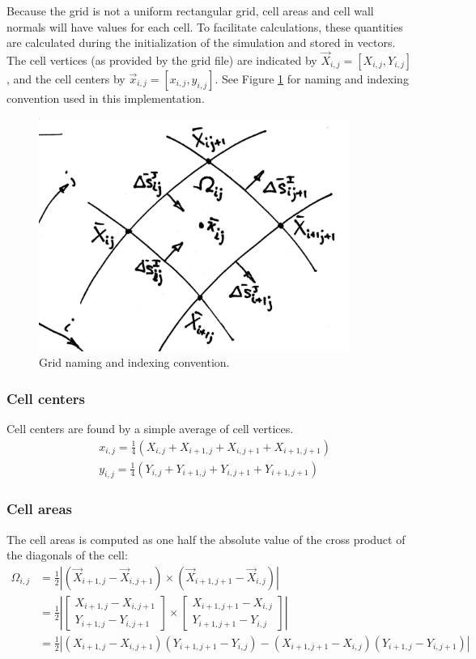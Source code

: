 \documentclass[11pt]{article}
\begin{document}
	Because the grid is not a uniform rectangular grid, cell areas and cell wall normals will have values for each cell. To facilitate calculations, these quantities are calculated during the initialization of the simulation and stored in vectors.  The cell vertices (as provided by the grid file) are indicated by $\vec{X}_{i,j}=[X_{i,j},Y_{i,j}]$, and the cell centers by $\vec{x}_{i,j}=[x_{i,j},y_{i,j}]$.  See Figure \ref{grid_nameing} for naming and indexing convention used in this implementation.
		\begin{figure}[ht!]
			\centering
			\includegraphics[width=4in]{figures/grid_naming_conv.jpg}
			\caption{Grid naming and indexing convention.}
			\label{grid_nameing}
		\end{figure}
		
	\subsubsection*{Cell centers}
	Cell centers are found by a simple average of cell vertices.
		\begin{align}
		&x_{i,j} = \frac{1}{4} (X_{i,j} + X_{i+1,j} + X_{i,j+1} + X_{i+1,j+1}) \\
		&y_{i,j} = \frac{1}{4} (Y_{i,j} + Y_{i+1,j} + Y_{i,j+1} + Y_{i+1,j+1})
		\end{align}
	
	\subsubsection*{Cell areas}
	The cell areas is computed as one half the absolute value of the cross product of the diagonals of the cell:
		\begin{align}
		\Omega_{i,j} &= \frac{1}{2} \left|(\vec{X}_{i+1,j} - \vec{X}_{i,j+1}) \times (\vec{X}_{i+1,j+1} - \vec{X}_{i,j})\right| \\
		& = \frac{1}{2} \left| \begin{bmatrix}
		X_{i+1,j} - X_{i,j+1} \\ Y_{i+1,j} - Y_{i,j+1}
		\end{bmatrix} \times \begin{bmatrix}
		X_{i+1,j+1} - X_{i,j} \\ Y_{i+1,j+1} - Y_{i,j}
		\end{bmatrix} \right| \\
		& = \frac{1}{2} \left| (X_{i+1,j} - X_{i,j+1})(Y_{i+1,j+1} - Y_{i,j}) - (X_{i+1,j+1} - X_{i,j})(Y_{i+1,j} - Y_{i,j+1}) \right|
		\end{align}
		
\end{document}
